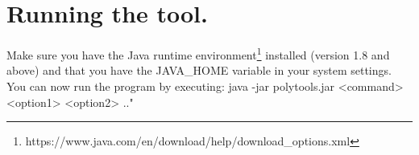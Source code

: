 \section{Running the tool.}
Make sure you have the Java runtime environment\footnote{https://www.java.com/en/download/help/download\_options.xml} installed (version 1.8 and above) and that you have the JAVA\_HOME variable in your system settings. You can now run the program by executing: java -jar polytools.jar <command> <option1> <option2> .."
